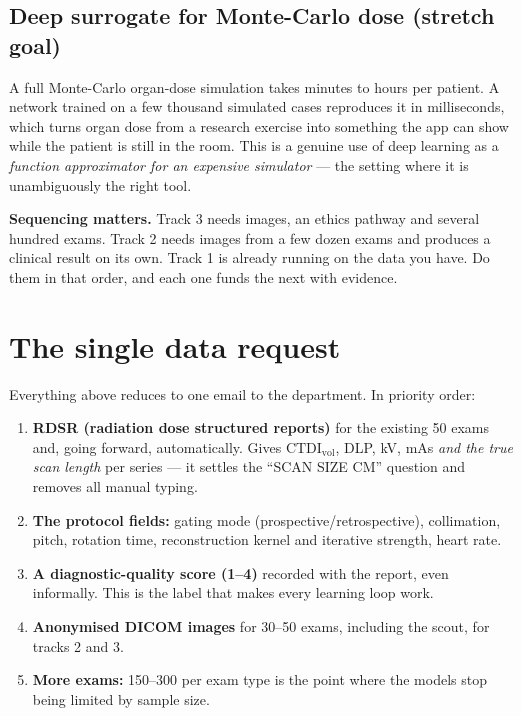 \documentclass[10pt,a4paper]{article}
\newcommand{\ctdi}{\ensuremath{\mathrm{CTDI}_{\mathrm{vol}}}}
\begin{document}
\subsection{Deep surrogate for Monte-Carlo dose (stretch goal)}
A full Monte-Carlo organ-dose simulation takes minutes to hours per patient. A network trained on a few thousand
simulated cases reproduces it in milliseconds, which turns organ dose from a research exercise into something the
app can show while the patient is still in the room. This is a genuine use of deep learning as a
\textit{function approximator for an expensive simulator} --- the setting where it is unambiguously the right tool.

\begin{warnbox}
\textbf{Sequencing matters.} Track 3 needs images, an ethics pathway and several hundred exams. Track 2 needs
images from a few dozen exams and produces a clinical result on its own. Track 1 is already running on the data
you have. Do them in that order, and each one funds the next with evidence.
\end{warnbox}

\section{The single data request}

Everything above reduces to one email to the department. In priority order:

\begin{enumerate}
\item \textbf{RDSR (radiation dose structured reports)} for the existing 50 exams and, going forward,
automatically. Gives \ctdi, DLP, kV, mAs \textit{and the true scan length} per series --- it settles the
``SCAN SIZE CM'' question and removes all manual typing.
\item \textbf{The protocol fields:} gating mode (prospective/retrospective), collimation, pitch, rotation time,
reconstruction kernel and iterative strength, heart rate.
\item \textbf{A diagnostic-quality score (1--4)} recorded with the report, even informally. This is the label that
makes every learning loop work.
\item \textbf{Anonymised DICOM images} for 30--50 exams, including the scout, for tracks 2 and 3.
\item \textbf{More exams:} 150--300 per exam type is the point where the models stop being limited by sample size.
\end{enumerate}
\end{document}
